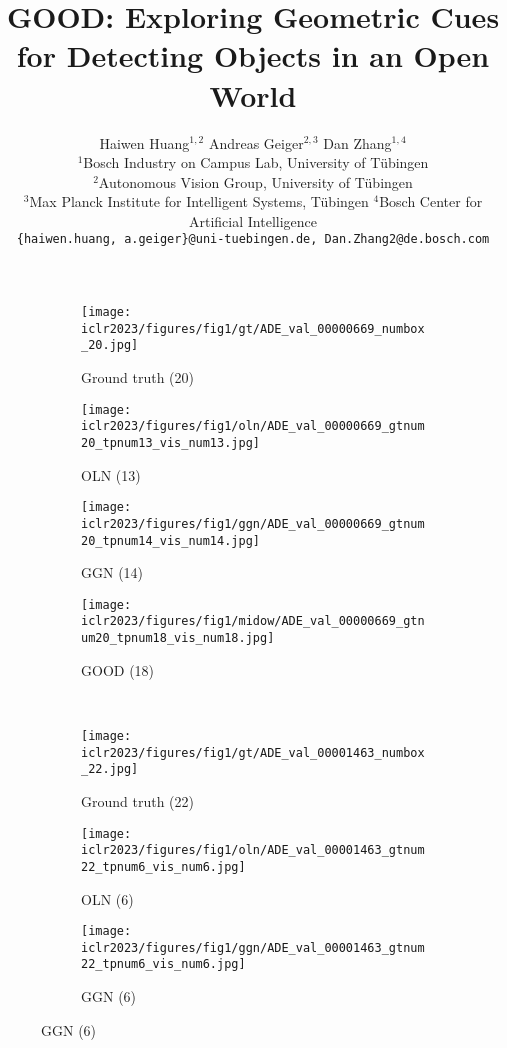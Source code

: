 \documentclass{article} \usepackage{iclr2023_conference,times}
\title{GOOD: Exploring Geometric Cues for Detecting Objects in an Open World}
\author{Haiwen Huang$^{1,2}$ \; Andreas Geiger$^{2,3}$ \; Dan Zhang$^{1,4}$ \\
$^{1}$Bosch Industry on Campus Lab, University of Tübingen\\ $^{2}$Autonomous Vision Group, University of Tübingen\\
$^{3}$Max Planck Institute for Intelligent Systems, Tübingen \;
$^{4}$Bosch Center for Artificial Intelligence\\
\texttt{\{haiwen.huang, a.geiger\}@uni-tuebingen.de, Dan.Zhang2@de.bosch.com} }
\begin{document}
\maketitle

\begin{figure}[h]
     \centering
     \begin{subfigure}[b]{0.244\textwidth}
         \centering
         \texttt{[image: iclr2023/figures/fig1/gt/ADE\_val\_00000669\_numbox\_20.jpg]}
         \caption{Ground truth (20)}
         \label{fig:y equals x}
     \end{subfigure}
     \begin{subfigure}[b]{0.244\textwidth}
         \centering
         \texttt{[image: iclr2023/figures/fig1/oln/ADE\_val\_00000669\_gtnum20\_tpnum13\_vis\_num13.jpg]}
         \caption{OLN (13)}
         \label{fig:three sin x}
     \end{subfigure}
     \begin{subfigure}[b]{0.244\textwidth}
         \centering
         \texttt{[image: iclr2023/figures/fig1/ggn/ADE\_val\_00000669\_gtnum20\_tpnum14\_vis\_num14.jpg]}
         \caption{GGN (14)}
         \label{fig:five over x}
     \end{subfigure} 
     \begin{subfigure}[b]{0.244\textwidth}
         \centering
         \texttt{[image: iclr2023/figures/fig1/midow/ADE\_val\_00000669\_gtnum20\_tpnum18\_vis\_num18.jpg]}
         \caption{GOOD (18)}
         \label{fig:five over x}
     \end{subfigure} 
     \\
     \begin{subfigure}[b]{0.244\textwidth}
         \centering
         \texttt{[image: iclr2023/figures/fig1/gt/ADE\_val\_00001463\_numbox\_22.jpg]}
         \caption{Ground truth (22)}
         \label{fig:y equals x}
     \end{subfigure}
     \begin{subfigure}[b]{0.244\textwidth}
         \centering
         \texttt{[image: iclr2023/figures/fig1/oln/ADE\_val\_00001463\_gtnum22\_tpnum6\_vis\_num6.jpg]}
         \caption{OLN (6)}
         \label{fig:three sin x}
     \end{subfigure}
     \begin{subfigure}[b]{0.244\textwidth}
         \centering
         \texttt{[image: iclr2023/figures/fig1/ggn/ADE\_val\_00001463\_gtnum22\_tpnum6\_vis\_num6.jpg]}
         \caption{GGN (6)}

\end{subfigure}
\end{figure}
\end{document}
